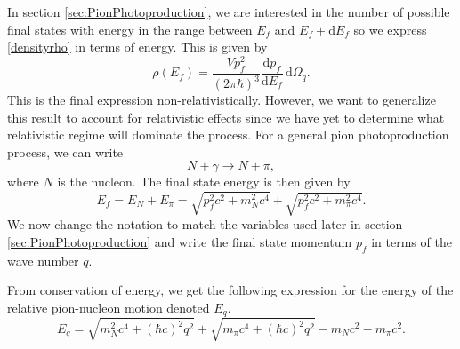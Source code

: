 In section \ref{sec:PionPhotoproduction}, we are interested in the number of possible final states with energy in the range between $E_f$ and $E_f + \text{d}E_f$ so we express \eqref{densityrho} in terms of energy. This is given by
\begin{equation} \label{densityenergy}
	\rho(E_f) = \frac{V p_f^2}{(2\pi \hbar)^3} \frac{\text{d}p_f}{\text{d}E_f} \, \text{d}\Omega_q.
\end{equation}
This is the final expression non-relativistically. However, we want to generalize this result to account for relativistic effects since we have yet to determine what relativistic regime will dominate the process. For a general pion photoproduction process, we can write
\begin{equation} \label{twobody}
	N + \gamma \rightarrow N+\pi,
\end{equation}
where $N$ is the nucleon. The final state energy is then given by \cite{Kernebog}
\begin{equation} \label{Ef}
	E_f = E_N + E_\pi = \sqrt{p_f^2 c^2 +m_N^2c^4} + \sqrt{p_f^2c^2 + m^2_\pi c^4}.
\end{equation}
We now change the notation to match the variables used later in section \ref{sec:PionPhotoproduction} and write the final state momentum $p_f$ in terms of the wave number $q$. 


From conservation of energy, we get the following expression for the energy of the relative pion-nucleon motion denoted $E_q$. 
\begin{equation} \label{Eq}
	E_q = \sqrt{m_N^2 c^4+(\hbar c)^2q^2} + \sqrt{m_\pi c^4+(\hbar c)^2 q^2}-m_N c^2-m_\pi c^2.
\end{equation}

